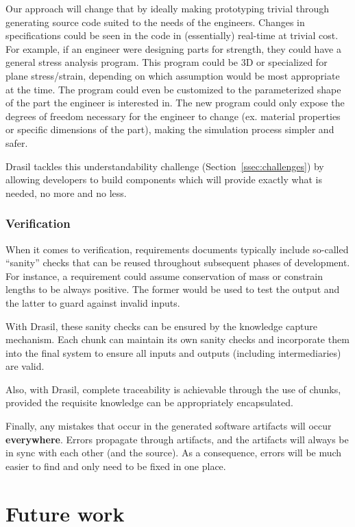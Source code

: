 \documentclass{sig-alternate-05-2015}
\newcommand{\lss}{Drasil}
\begin{document}
Our approach will change that by ideally making prototyping trivial through
generating source code suited to the needs of the engineers. Changes in
specifications could be seen in the code in (essentially) real-time at trivial
cost. For example, if an engineer were designing parts for strength, they could
have a general stress analysis program. This program could be 3D or specialized
for plane stress/strain, depending on which assumption would be most appropriate
at the time. The program could even be customized to the parameterized shape of
the part the engineer is interested in. The new program could only expose the
degrees of freedom necessary for the engineer to change (ex. material properties
or specific dimensions of the part), making the simulation process simpler and
safer.

\lss{} tackles this understandability challenge (Section~\ref{ssec:challenges})
by allowing developers to build components which will provide exactly what is
needed, no more and no less.

\subsubsection{Verification} \label{sssec:adv_verify}

When it comes to verification, requirements documents typically include
so-called ``sanity'' checks that can be reused throughout subsequent phases of
development. For instance, a requirement could assume conservation of mass or
constrain lengths to be always positive. The former would be used to test the
output and the latter to guard against invalid inputs.

With \lss, these sanity checks can be ensured by the knowledge capture
mechanism. Each chunk can maintain its own sanity checks and incorporate them
into the final system to ensure all inputs and outputs (including
intermediaries) are valid.

Also, with \lss{}, complete traceability is achievable through the use of
chunks, provided the requisite knowledge can be appropriately encapsulated.

Finally, any mistakes that occur in the generated software artifacts will occur
\textbf{everywhere}. Errors propagate through artifacts, and the artifacts will
always be in sync with each other (and the source). As a consequence, errors
will be much easier to find and only need to be fixed in one place.

\section{Future work} \label{sec:todo}
\end{document}
